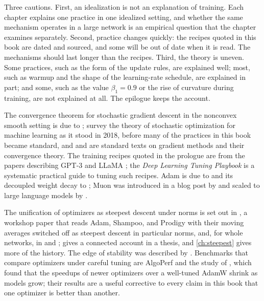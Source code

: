 \begin{refsection}
Three cautions. First, an idealization is not an explanation of training. Each chapter explains one practice in one idealized setting, and whether the same mechanism operates in a large network is an empirical question that the chapter examines separately. Second, practice changes quickly: the recipes quoted in this book are dated and sourced, and some will be out of date when it is read. The mechanisms should last longer than the recipes. Third, the theory is uneven. Some practices, such as the form of the update rules, are explained well; most, such as warmup and the shape of the learning-rate schedule, are explained in part; and some, such as the value $\beta_1=0.9$ or the rise of curvature during training, are not explained at all. The epilogue keeps the account.

\notesandrefs

The convergence theorem for stochastic gradient descent in the nonconvex smooth setting is due to \textcite{GhadimiLan2013}; \textcite{BottouCurtisNocedal2018} survey the theory of stochastic optimization for machine learning as it stood in 2018, before many of the practices in this book became standard, and \textcite{Nesterov2018} and \textcite{Polyak1987} are standard texts on gradient methods and their convergence theory. The training recipes quoted in the prologue are from the papers describing GPT-3 \parencite{BrownEtAl2020} and LLaMA \parencite{TouvronEtAl2023}; the \emph{Deep Learning Tuning Playbook} \parencite{GodboleEtAl2023} is a systematic practical guide to tuning such recipes. Adam is due to \textcite{KingmaBa2015} and its decoupled weight decay to \textcite{LoshchilovHutter2019}; Muon was introduced in a blog post by \textcite{JordanEtAl2024Muon} and scaled to large language models by \textcite{LiuEtAl2025Muon}.

The unification of optimizers as steepest descent under norms is set out in \textcite{BernsteinNewhouse2024}, a workshop paper that reads Adam, Shampoo, and Prodigy with their moving averages switched off as steepest descent in particular norms, and, for whole networks, in \textcite{LargeEtAl2024} and \textcite{BernsteinNewhouse2025}; \textcite{Newhouse2025} gives a connected account in a thesis, and \cref{ch:steepest} gives more of the history. The edge of stability was described by \textcite{CohenEtAl2021}. Benchmarks that compare optimizers under careful tuning are AlgoPerf \parencite{DahlEtAl2023} and the study of \textcite{WenEtAl2026Fantastic}, which found that the speedups of newer optimizers over a well-tuned AdamW shrink as models grow; their results are a useful corrective to every claim in this book that one optimizer is better than another.

\printchapterbib
\end{refsection}
